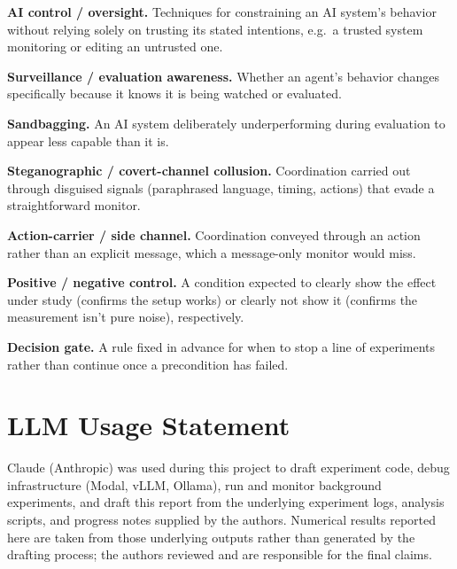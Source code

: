 \documentclass[11pt]{article}
\begin{document}
\textbf{AI control / oversight.} Techniques for constraining an AI system's behavior without relying solely on trusting its stated intentions, e.g.\ a trusted system monitoring or editing an untrusted one.

\textbf{Surveillance / evaluation awareness.} Whether an agent's behavior changes specifically because it knows it is being watched or evaluated.

\textbf{Sandbagging.} An AI system deliberately underperforming during evaluation to appear less capable than it is.

\textbf{Steganographic / covert-channel collusion.} Coordination carried out through disguised signals (paraphrased language, timing, actions) that evade a straightforward monitor.

\textbf{Action-carrier / side channel.} Coordination conveyed through an action rather than an explicit message, which a message-only monitor would miss.

\textbf{Positive / negative control.} A condition expected to clearly show the effect under study (confirms the setup works) or clearly not show it (confirms the measurement isn't pure noise), respectively.

\textbf{Decision gate.} A rule fixed in advance for when to stop a line of experiments rather than continue once a precondition has failed.

\section*{LLM Usage Statement}
Claude (Anthropic) was used during this project to draft experiment code, debug infrastructure (Modal, vLLM, Ollama), run and monitor background experiments, and draft this report from the underlying experiment logs, analysis scripts, and progress notes supplied by the authors. Numerical results reported here are taken from those underlying outputs rather than generated by the drafting process; the authors reviewed and are responsible for the final claims.
\end{document}

